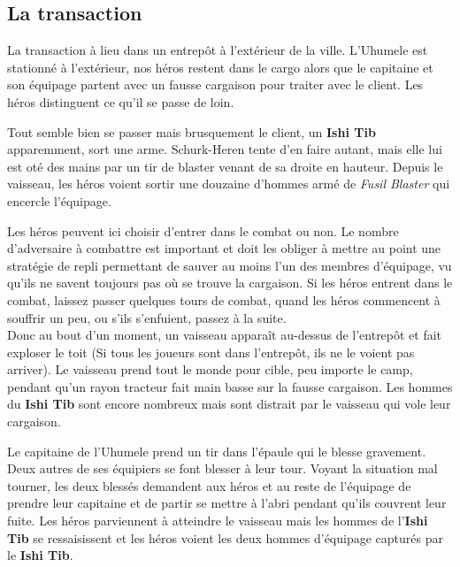 \subsection{La transaction}

La transaction à lieu dans un entrepôt à l’extérieur de la ville. L’Uhumele est stationné à l’extérieur, nos héros restent dans le cargo alors que le capitaine et son équipage partent avec un fausse cargaison pour traiter avec le client. Les héros distinguent ce qu’il se passe de loin.

Tout semble bien se passer mais brusquement le client, un \textbf{Ishi Tib} apparemment, sort une arme. Schurk-Heren tente d’en faire autant, mais elle lui est oté des mains par un tir de blaster venant de sa droite en hauteur. Depuis le vaisseau, les héros voient sortir une douzaine d’hommes armé de \textit{Fusil Blaster} qui encercle l’équipage.

Les héros peuvent ici choisir d’entrer dans le combat ou non. Le nombre d’adversaire à combattre est important et doit les obliger à mettre au point une stratégie de repli permettant de sauver au moins l’un des membres d’équipage, vu qu’ils ne savent toujours pas où se trouve la cargaison. Si les héros entrent dans le combat, laissez passer quelques tours de combat, quand les héros commencent à souffrir un peu, ou s’ils s’enfuient, passez à la suite.\\

Donc au bout d’un moment, un vaisseau apparaît au-dessus de l’entrepôt et fait exploser le toit (Si tous les joueurs sont dans l’entrepôt, ils ne le voient pas arriver). Le vaisseau prend tout le monde pour cible, peu importe le camp, pendant qu’un rayon tracteur fait main basse sur la fausse cargaison.
Les hommes du \textbf{Ishi Tib} sont encore nombreux mais sont distrait par le vaisseau qui vole leur cargaison.

Le capitaine de l’Uhumele prend un tir dans l’épaule qui le blesse gravement. Deux autres de ses équipiers se font blesser à leur tour. Voyant la situation mal tourner, les deux blessés demandent aux héros et au reste de l’équipage de prendre leur capitaine et de partir se mettre à l’abri pendant qu’ils couvrent leur fuite. Les héros parviennent à atteindre le vaisseau mais les hommes de l’\textbf{Ishi Tib} se ressaisissent et les héros voient les deux hommes d’équipage capturés par le \textbf{Ishi Tib}.

